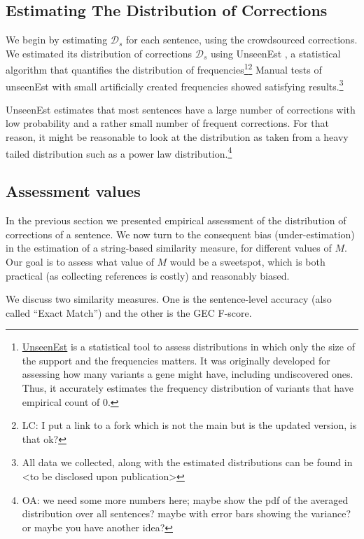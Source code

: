 \documentclass[english]{article}
\newcommand{\oa}[1]{\footnote{\color{red}OA: #1}}
\newcommand{\lc}[1]{\footnote{\color{green}LC: #1}}
\begin{document}
\subsection{Estimating The Distribution of Corrections}

We begin by estimating $\mathcal{D}_s$ for each sentence, using the crowdsourced
corrections. We estimated its distribution of corrections $\mathcal{D}_s$
using {\sc UnseenEst} \cite{zou2015quantifying}, a statistical algorithm that quantifies
the distribution of frequencies\footnote{\href{https://github.com/borgr/unseenest}{UnseenEst} is a statistical tool to assess distributions in which only the size of the support and the frequencies matters. It was originally developed for assessing how many variants a gene might have, including undiscovered ones. Thus, it accurately estimates the frequency distribution of variants that have empirical count of 0. }\lc{I put a link to a fork which is not the main but is the updated version, is that ok?} Manual tests of unseenEst with small artificially created frequencies showed
satisfying results.\footnote{All data
  we collected, along with the estimated distributions can be found in <to be disclosed
  upon publication>}

{\sc UnseenEst} estimates that most sentences have a large number of corrections with low probability and a rather small number of frequent corrections. For that reason, it might be reasonable to look at the distribution as taken from a heavy tailed distribution such as a power law distribution.\oa{we need some more numbers here; maybe show the pdf of the averaged distribution over all sentences? maybe with error bars showing the variance? or maybe you have another idea?}

\subsection{Assessment values}\label{subsec:Assessment-values}

In the previous section we presented empirical assessment of the distribution of
corrections of a sentence. We now turn to the consequent bias (under-estimation) in the estimation of a string-based similarity measure, for different values of $M$. Our goal is to assess what value of $M$ would be a sweetspot, which is both practical (as collecting references is costly) and reasonably biased.

We discuss two similarity measures. One is the sentence-level accuracy (also called ``Exact Match'') and the other is the GEC F-score.
\end{document}
